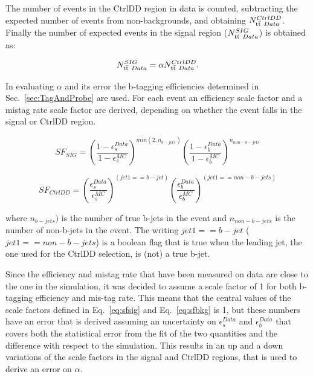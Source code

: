 The number of events in the CtrlDD region in data is counted, subtracting the expected number of events from non-\ttbar backgrounds, and obtaining $N_{\mathrm{t}\bar{\mathrm{t}}~Data}^{CtrlDD}$. Finally the number of expected \ttbar events in the signal region ($N_{\mathrm{t}\bar{\mathrm{t}}~Data}^{SIG}$) is obtained as:

\begin{equation}
N_{\mathrm{t}\bar{\mathrm{t}}~Data}^{SIG} = \alpha{}N_{\mathrm{t}\bar{\mathrm{t}}~Data}^{CtrlDD}.
\end{equation}

In evaluating $\alpha$ and its error the b-tagging efficiencies determined in Sec.~\ref{sec:TagAndProbe} are used. 
For each event an efficiency scale factor and a mistag rate scale factor are derived, depending on whether the event falls in the signal or CtrlDD region.

\begin{equation}
\label{eq:sfsig}
SF_{SIG} = \left(\frac{1-\epsilon_{s}^{Data}}{1-\epsilon_{s}^{MC}}\right)^{min(2, n_{b-jets})} \left(\frac{1-\epsilon_{b}^{Data}}{1-\epsilon_{b}^{MC}}\right)^{n_{non-b-jets}} 
\end{equation}

\begin{equation}
\label{eq:sfbkg}
SF_{CtrlDD} = \left(\frac{\epsilon_{s}^{Data}}{\epsilon_{s}^{MC}}\right)^{(jet1 == b-jet)} \left(\frac{\epsilon_{b}^{Data}}{\epsilon_{b}^{MC}}\right)^{(jet1 == non-b-jets)} 
\end{equation}

where $n_{b-jets})$ is the number of true b-jets in the event and $n_{non-b-jets}$ is the number of non-b-jets in the event. The writing $jet1 == b-jet$ ($jet1 == non-b-jets$) is a boolean flag that is true when the leading jet, the one used for the CtrlDD selection, is (not) a true b-jet.

Since the efficiency and mistag rate that have been measured on data are close to the one in the simulation, it was decided to assume a scale factor of 1 for both b-tagging efficiency and mis-tag rate. This means that the central values of the scale factors defined in Eq.~\ref{eq:sfsig} and Eq.~\ref{eq:sfbkg} is 1, but these numbers have an error that is derived assuming an uncertainty on $\epsilon_{s}^{Data}$ and $\epsilon_{b}^{Data}$ that covers both the statistical error from the fit of the two quantities and the difference with respect to the simulation.
This results in an up and a down variations of the scale factors in the signal and CtrlDD regions, that is used to derive an error on $\alpha$.

